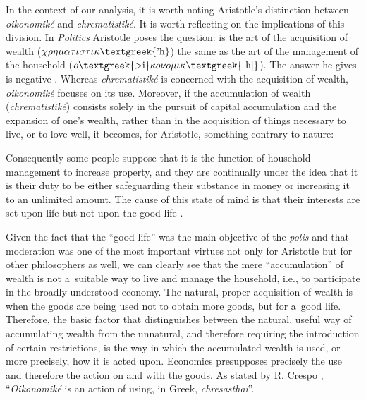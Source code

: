 In the context of our analysis, it is worth noting Aristotle's distinction between \textit{oikonomiké} and \textit{chrematistiké}. It is worth reflecting on the implications of this division. In \textit{Politics} Aristotle poses the question: is the art of the acquisition of wealth ($\chi \rho \eta \mu \alpha \tau \iota \sigma \tau \iota \kappa \text{\textgreek{'h}}$) the same as the art of the management of the household ($o\text{\textgreek{>i}}\kappa o\nu o\mu \iota \kappa \text{\textgreek{~h|}}$). The answer he gives is negative 
\parencite[][]{}. %
 Whereas \textit{chrematistiké} is concerned with the acquisition of wealth, \textit{oikonomiké} focuses on its use. Moreover, if the accumulation of wealth (\textit{chrematistiké}) consists solely in the pursuit of capital accumulation and the expansion of one's wealth, rather than in the acquisition of things necessary to live, or to love well, it becomes, for Aristotle, something contrary to nature:



Consequently some people suppose that it is the function of household management to increase property, and they are continually under the idea that it is their duty to be either safeguarding their substance in money or increasing it to an unlimited amount. The cause of this state of mind is that their interests are set upon life but not upon the good life 
\parencite[][]{}.%




Given the fact that the ``good life'' was the main objective of the \textit{polis} and that moderation was one of the most important virtues not only for Aristotle but for other philosophers as well, we can clearly see that the mere ``accumulation'' of wealth is not a~suitable way to live and manage the household, i.e., to participate in the broadly understood economy. The natural, proper acquisition of wealth is when the goods are being used not to obtain more goods, but for a~good life. Therefore, the basic factor that distinguishes between the natural, useful way of accumulating wealth from the unnatural, and therefore requiring the introduction of certain restrictions, is the way in which the accumulated wealth is used, or more precisely, how it is acted upon. Economics presupposes precisely the use and therefore the action on and with the goods. As stated by R. Crespo 
\parencite*[][p.772]{crespo_ontology_2006}, %
 ``\textit{Oikonomiké} is an action of using, in Greek, \textit{chresasthai}''.



